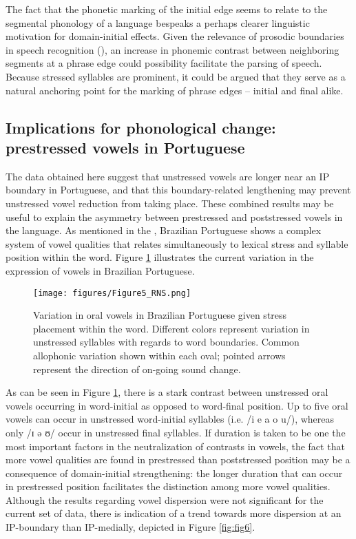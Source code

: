 \documentclass[output=paper]{langscibook}
\begin{document}
The fact that the phonetic marking of the initial edge seems to relate to the segmental phonology of a language bespeaks a perhaps clearer linguistic motivation for domain-initial effects. Given the relevance of prosodic boundaries in speech recognition (\citealt{carlson09}), an increase in phonemic contrast between neighboring segments at a phrase edge could possibility facilitate the parsing of speech. Because stressed syllables are prominent, it could be argued that they serve as a natural anchoring point for the marking of phrase edges – initial and final alike.

\subsection{Implications for phonological change: prestressed vowels in Portuguese}
The data obtained here suggest that unstressed vowels are longer near an IP boundary in Portuguese, and that this boundary-related lengthening may prevent unstressed vowel reduction from taking place. These combined results may be useful to explain the asymmetry between prestressed and poststressed vowels in the language. As mentioned in the , Brazilian Portuguese shows a complex system of vowel qualities that relates simultaneously to lexical stress and syllable position within the word. Figure \ref{fig:fig5} illustrates the current variation in the expression of vowels in Brazilian Portuguese.



\begin{figure}
\texttt{[image: figures/Figure5\_RNS.png]}
\caption{Variation in oral vowels in Brazilian Portuguese given stress placement within the word. Different colors represent variation in unstressed syllables with regards to word boundaries. Common allophonic variation shown within each oval; pointed arrows represent the direction of on-going sound change.}
\label{fig:fig5}
\end{figure}




As can be seen in Figure \ref{fig:fig5}, there is a stark contrast between unstressed oral vowels occurring in word-initial as opposed to word-final position. Up to five oral vowels can occur in unstressed word-initial syllables (i.e. /i e a o u/), whereas only /ɪ ə ʊ/ occur in unstressed final syllables. If duration is taken to be one the most important factors in the neutralization of contrasts in vowels, the fact that more vowel qualities are found in prestressed than poststressed position may be a consequence of domain-initial strengthening: the longer duration that can occur in prestressed position facilitates the distinction among more vowel qualities. Although the results regarding vowel dispersion were not significant for the current set of data, there is indication of a trend towards more dispersion at an IP-boundary than IP-medially, depicted in Figure \ref{fig:fig6}.
\end{document}
